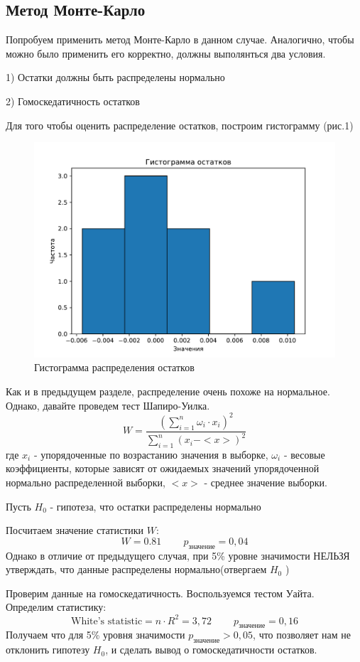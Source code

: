 \documentclass[a4paper,20pt]{article}
\theoremstyle{definition}
\begin{document}
\subsection{Метод Монте-Карло}
Попробуем применить метод Монте-Карло в данном случае. 
Аналогично, чтобы можно было применить его корректно, должны выполянться два условия. \par
1) Остатки должны быть распределены нормально\par
2) Гомоскедатичность остатков \par
Для того чтобы оценить распределение остатков, построим гистограмму (рис.1)
\begin{figure}[h!]
    \centering
    \includegraphics[width=0.7\linewidth]{gist_uncorrect.pdf}
    \caption{Гистограмма распределения остатков}    
\end{figure}
Как и в предыдущем разделе, распределение очень похоже на нормальное. Однако, давайте проведем тест Шапиро-Уилка.
\begin{equation}
	W = \frac{(\sum_{i=1}^{n}\omega_i \cdot x_i)^2}{\sum_{i=1}^{n}(x_i - <x>)^2}
\end{equation}
где $x_i$ - упорядоченные по возрастанию значения в выборке, $\omega_i$ -  весовые коэффициенты, которые зависят от ожидаемых значений упорядоченной нормально распределенной выборки,
 $<x>$ - среднее значение выборки. \par
 Пусть $H_0$ - гипотеза, что остатки распределены нормально \par
 Посчитаем значение статистики $W$:
 \begin{equation}
	W = 0.81 \;\;\;\;\;\;\;\; p_{\text{значение}} = 0,04
 \end{equation}
 Однако в отличие от предыдущего случая, при 5\% уровне значимости НЕЛЬЗЯ утверждать, что данные распределены нормально(отвергаем $H_0$ )

 Проверим данные на гомоскедатичность. Воспользуемся тестом Уайта. Определим статистику:
 \begin{equation}
	\text{White's statistic} = n \cdot R^2 = 3,72 \;\;\;\;\;\;\;\; p_{\text{значение}} = 0,16
 \end{equation}
 Получаем что для 5\% уровня значимости $p_{\text{значение}} > 0,05$, что позволяет нам не отклонить гипотезу $H_0$, и сделать вывод о гомоскедатичности остатков.
\end{document}
